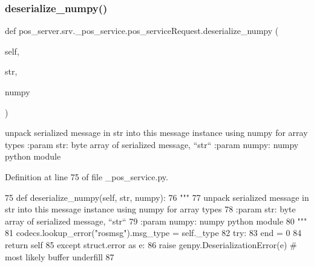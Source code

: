 \subsubsection{\texorpdfstring{deserialize\+\_\+numpy()}{deserialize\_numpy()}}
{\footnotesize\ttfamily def pos\+\_\+server.\+srv.\+\_\+pos\+\_\+service.\+pos\+\_\+service\+Request.\+deserialize\+\_\+numpy (\begin{DoxyParamCaption}\item[{}]{self,  }\item[{}]{str,  }\item[{}]{numpy }\end{DoxyParamCaption})}

\begin{DoxyVerb}unpack serialized message in str into this message instance using numpy for array types
:param str: byte array of serialized message, ``str``
:param numpy: numpy python module
\end{DoxyVerb}
 

Definition at line 75 of file \+\_\+pos\+\_\+service.\+py.


\begin{DoxyCode}
75   \textcolor{keyword}{def }deserialize\_numpy(self, str, numpy):
76     \textcolor{stringliteral}{"""}
77 \textcolor{stringliteral}{    unpack serialized message in str into this message instance using numpy for array types}
78 \textcolor{stringliteral}{    :param str: byte array of serialized message, ``str``}
79 \textcolor{stringliteral}{    :param numpy: numpy python module}
80 \textcolor{stringliteral}{    """}
81     codecs.lookup\_error(\textcolor{stringliteral}{"rosmsg"}).msg\_type = self.\_type
82     \textcolor{keywordflow}{try}:
83       end = 0
84       \textcolor{keywordflow}{return} self
85     \textcolor{keywordflow}{except} struct.error \textcolor{keyword}{as} e:
86       \textcolor{keywordflow}{raise} genpy.DeserializationError(e)  \textcolor{comment}{# most likely buffer underfill}
87 
\end{DoxyCode}
\mbox{\label{classpos__server_1_1srv_1_1__pos__service_1_1pos__serviceRequest_a94fcc622dd338edf578ee25bf7d08b6c}} 
